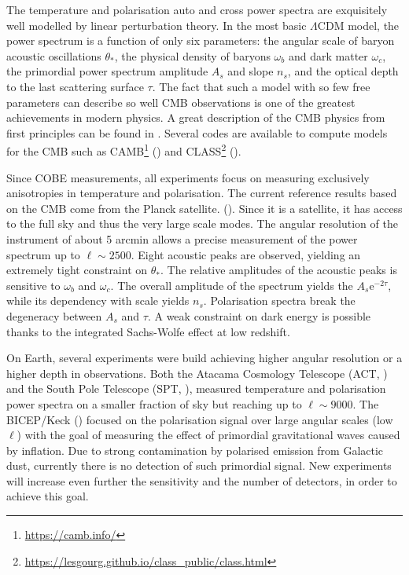     The temperature and polarisation auto and cross power spectra 
    are exquisitely well modelled by linear perturbation theory. 
    In the most basic $\Lambda$CDM model, the power spectrum is a 
    function of only six parameters: the angular scale of baryon 
    acoustic oscillations $\theta_*$, 
    the physical density of baryons $\omega_b$ and dark matter $\omega_c$, 
    the primordial power spectrum amplitude $A_s$ and slope $n_s$, 
    and the optical depth to the last scattering surface $\tau$.
    The fact that such a model with so few free parameters can 
    describe so well CMB observations is one of the greatest achievements 
    in modern physics. 
    A great description of the CMB physics 
    from first principles can be found in \cite{dodelsonscottModernCosmology2nd2020}.
    Several codes are available to compute models for the CMB 
    such as \textsc{CAMB}\footnote{\url{https://camb.info/}} 
    (\cite{lewisEfficientComputationCosmic2000})
    and \textsc{CLASS}\footnote{\url{https://lesgourg.github.io/class_public/class.html}} 
    (\cite{lesgourguesCosmicLinearAnisotropy2011}). 
    
    Since COBE measurements, all experiments focus on measuring exclusively 
    anisotropies in temperature and polarisation. 
    The current reference results based on the CMB come from the Planck satellite.
    (\cite{planckcollaborationPlanck2018Results2020}). Since it is a satellite, it has
    access to the full sky and thus the very large scale modes. 
    The angular resolution of the instrument of about 5 arcmin allows 
    a precise measurement of the power spectrum up to $\ell \sim 2500$. 
    Eight acoustic peaks are observed, yielding an extremely tight constraint 
    on $\theta_*$. The relative amplitudes of the acoustic peaks is sensitive to 
    $\omega_b$ and $\omega_c$. The overall amplitude of the spectrum yields the 
    $A_s \text{e}^{-2\tau}$, while its dependency with scale yields $n_s$. 
    Polarisation spectra break the degeneracy between $A_s$ and $\tau$. 
    A weak constraint on dark energy is possible thanks to the integrated Sachs-Wolfe effect 
    at low redshift.

    On Earth, several experiments were build achieving higher angular resolution
    or a higher depth in observations. 
    Both the Atacama Cosmology Telescope (ACT, \cite{aiolaAtacamaCosmologyTelescope2020})
    and the South Pole Telescope (SPT, \cite{aylorComparisonCosmologicalParameters2017, 
    balkenholConstraintsLambdaCDM2021, 
    dutcherMeasurementsEModePolarization2021}), measured temperature and polarisation power spectra 
    on a smaller fraction of sky but reaching up to $\ell \sim 9000$.
    The BICEP/Keck (\cite{bicep/keckDemonstrationImprovedConstraints2021}) focused on 
    the polarisation signal over large angular scales (low $\ell$) with the goal of
    measuring the effect of primordial gravitational waves caused by inflation.  
    Due to strong contamination by polarised emission from Galactic dust, 
    currently there is no detection of such primordial signal. 
    New experiments will increase even further the sensitivity and the number of detectors,
    in order to achieve this goal. 




